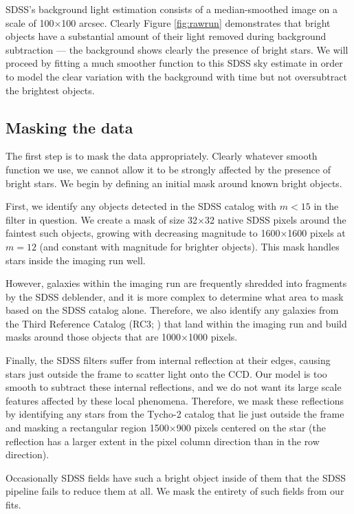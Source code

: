 \documentclass[10pt,preprint]{aastex}
\begin{document}
SDSS's background light estimation consists of a median-smoothed image
on a scale of 100$\times$100 arcsec. Clearly Figure \ref{fig:rawrun}
demonstrates that bright objects have a substantial amount of their
light removed during background subtraction --- the background shows
clearly the presence of bright stars.  We will proceed by fitting a
much smoother function to this SDSS sky estimate in order to model the
clear variation with the background with time but not oversubtract the
brightest objects.

\subsection{Masking the data}
\label{sec:mask}

The first step is to mask the data appropriately. Clearly whatever
smooth function we use, we cannot allow it to be strongly affected by
the presence of bright stars. We begin by defining an initial mask
around known bright objects.

First, we identify any objects detected in the SDSS catalog with
$m<15$ in the filter in question. We create a mask of size
32$\times$32 native SDSS pixels around the faintest such objects,
growing with decreasing magnitude to 1600$\times$1600 pixels at $m=12$
(and constant with magnitude for brighter objects).  This mask handles
stars inside the imaging run well.

However, galaxies within the imaging run are frequently shredded into
fragments by the SDSS deblender, and it is more complex to determine
what area to mask based on the SDSS catalog alone. Therefore, we also
identify any galaxies from the Third Reference Catalog (RC3;
\citealt{devaucouleurs91a}) that land within the imaging run and build
masks around those objects that are 1000$\times$1000 pixels.

Finally, the SDSS filters suffer from internal reflection at their
edges, causing stars just outside the frame to scatter light onto the
CCD. Our model is too smooth to subtract these internal reflections,
and we do not want its large scale features affected by these local
phenomena.  Therefore, we mask these reflections by identifying any
stars from the Tycho-2 catalog that lie just outside the frame and
masking a rectangular region 1500$\times$900 pixels centered on the
star (the reflection has a larger extent in the pixel column direction
than in the row direction).

Occasionally SDSS fields have such a bright object inside of them that
the SDSS pipeline fails to reduce them at all.  We mask the entirety
of such fields from our fits.
\end{document}
